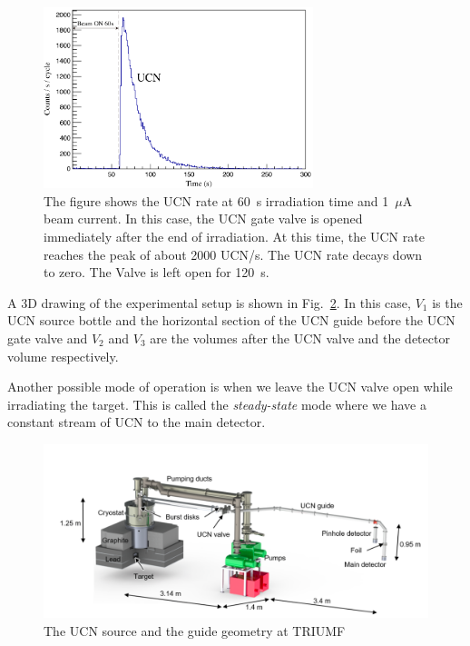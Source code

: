 \begin{figure}[h]
  \centering
  \includegraphics[width=0.7\textwidth]{UCNRate.png}
  \caption{The figure shows the UCN rate at 60~s irradiation time and
    1~$\mu$A beam current. In this case, the UCN gate valve is opened
    immediately after the end of irradiation. At this time, the UCN
    rate reaches the peak of about 2000 UCN/s. The UCN rate decays
    down to zero. The Valve is left open for 120~s. }
  \label{fig:UCNRate}
\end{figure}



A 3D drawing of the experimental setup is shown in
Fig.~\ref{fig:Source_all}. In this case, $V_1$ is the UCN source
bottle and the horizontal section of the UCN guide before the UCN gate
valve and $V_2$ and $V_3$ are the volumes after the UCN valve and the
detector volume respectively.




Another possible mode of operation is when we leave the UCN valve open
while irradiating the target. This is called the {\it{ steady-state}}
mode where we have a constant stream of UCN to the main detector.


\begin{figure}[h!]
  \centering
  \includegraphics[width=1.1\textwidth]{Source_all.png}
  \caption{The UCN source and the guide geometry at TRIUMF }
  \label{fig:Source_all}
\end{figure}


